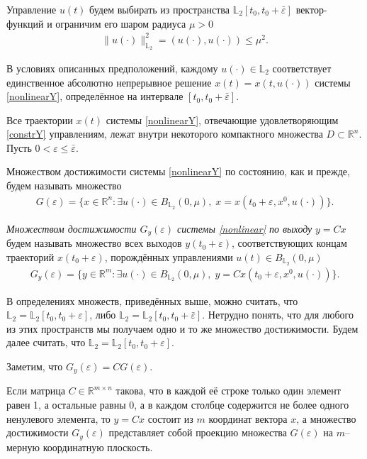 \documentclass[../main.tex]{subfiles}
\begin{document}
 Управление $u(t)$ будем выбирать из
пространства $\mathbb{L}_2[t_0,t_0+\bar{\varepsilon}]$ вектор-функций и ограничим его шаром радиуса $ \mu > 0 $
\begin{gather}\label{constrY}
	\lVert u(\cdot)\rVert^2_{\mathbb{L}_2} = \left(u(\cdot),u(\cdot) \right) \leqslant \mu^2.
\end{gather}

В условиях описанных предположений, каждому $ u(\cdot) \in \mathbb{L}_2 $ соответствует единственное абсолютно непрерывное решение $ x(t)=x(t,u(\cdot)) $ системы \eqref{nonlinearY}, определённое на интервале $ [t_0,t_0+\bar{\varepsilon}] $.

Все траектории $ x(t) $ системы \eqref{nonlinearY}, отвечающие удовлетворяющим \eqref{constrY} управлениям,  лежат внутри некоторого компактного множества $ D \subset \mathbb{R}^n $. Пусть $ 0 <  \varepsilon \leqslant \bar{\varepsilon} $. 

Множеством достижимости системы \eqref{nonlinearY} по состоянию, как и прежде, будем называть множество \begin{gather*}
	G(\varepsilon)=\{x\in \mathbb{R}^n:\exists u(\cdot)\in B_{\mathbb{L}_2}(0,\mu),\; x=x(t_0+\varepsilon,x^0,u(\cdot))\}.
\end{gather*}


\begin{definition}
	{\it Множеством достижимости $G_y(\varepsilon)$ системы \eqref{nonlinear} по выходу} $ y = C x $ будем называть множество всех выходов $ y(t_0+\varepsilon) $,
	соответствующих концам траекторий $ x(t_0+\varepsilon) $, порождённых управлениями $ u(t) \in B_{\mathbb{L}_2}(0,\mu)$
	\begin{gather*}
		G_y(\varepsilon)=\{y\in \mathbb{R}^m:\exists u(\cdot)\in B_{\mathbb{L}_2}(0,\mu),\; y=Cx(t_0+\varepsilon,x^0,u(\cdot))\}.
	\end{gather*}
\end{definition}

В определениях множеств, приведённых выше, можно считать, что $ \mathbb{L}_2 =\mathbb{L}_2[t_0,t_0+\varepsilon] $, либо  $ \mathbb{L}_2=\mathbb{L}_2[t_0,t_0+\bar{\varepsilon}] $. Нетрудно понять, что для любого из этих пространств мы получаем одно и то же множество достижимости. Будем далее считать, что $ \mathbb{L}_2 =\mathbb{L}_2[t_0,t_0+\varepsilon] $.
	
Заметим, что  $ G_y(\varepsilon) = C G(\varepsilon) $.	
	
Если матрица $ C \in \mathbb{R}^{m \times n} $ такова, что в каждой её строке только один элемент равен 1, а остальные равны 0, а в каждом столбце содержится не более одного ненулевого элемента, то $ y=Cx $ состоит из $ m$ координат вектора $ x $, а  множество достижимости $G_y(\varepsilon)$ представляет собой проекцию множества $ G(\varepsilon) $ на $m$--мерную координатную плоскость.
\end{document}
